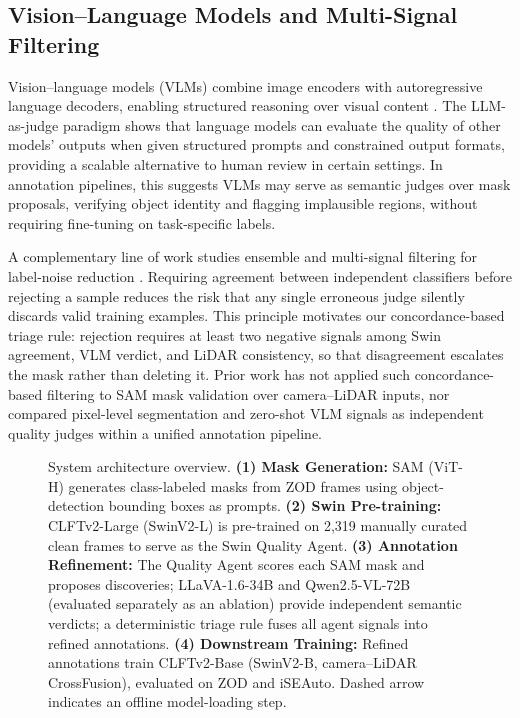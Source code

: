 \documentclass[conference]{IEEEtran}
\begin{document}
\subsection{Vision--Language Models and Multi-Signal Filtering}

Vision--language models (VLMs) combine image encoders with autoregressive language decoders, enabling structured reasoning over visual content \cite{liu2024llava,ye2023mplug,wang2024qwen2vl}. 
The LLM-as-judge paradigm \cite{zheng2023judging} shows that language models can evaluate the quality of other models' outputs when given structured prompts and constrained output formats, providing a scalable alternative to human review in certain settings. 
In annotation pipelines, this suggests VLMs may serve as semantic judges over mask proposals, verifying object identity and flagging implausible regions, without requiring fine-tuning on task-specific labels.

A complementary line of work studies ensemble and multi-signal filtering for label-noise reduction \cite{malach2017decoupling,han2018co}. 
Requiring agreement between independent classifiers before rejecting a sample reduces the risk that any single erroneous judge silently discards valid training examples. 
This principle motivates our concordance-based triage rule: rejection requires at least two negative signals among Swin agreement, VLM verdict, and LiDAR consistency, so that disagreement escalates the mask rather than deleting it. 
Prior work has not applied such concordance-based filtering to SAM mask validation over camera--LiDAR inputs, nor compared pixel-level segmentation and zero-shot VLM signals as independent quality judges within a unified annotation pipeline.



\begin{figure}[t]
    \centering
    \resizebox{\columnwidth}{!}{}
    \caption{System architecture overview.
             \textbf{(1) Mask Generation:} SAM (ViT-H) generates class-labeled masks from ZOD frames using object-detection bounding boxes as prompts.
             \textbf{(2) Swin Pre-training:} CLFTv2-Large (SwinV2-L) is pre-trained on 2{,}319 manually curated clean frames to serve as the Swin Quality Agent.
             \textbf{(3) Annotation Refinement:} The Quality Agent scores each SAM mask and proposes discoveries; LLaVA-1.6-34B and Qwen2.5-VL-72B (evaluated separately as an ablation) provide independent semantic verdicts; a deterministic triage rule fuses all agent signals into refined annotations.
             \textbf{(4) Downstream Training:} Refined annotations train CLFTv2-Base (SwinV2-B, camera--LiDAR CrossFusion), evaluated on ZOD and iSEAuto.
             Dashed arrow indicates an offline model-loading step.}
    \label{fig:architecture_overview}
\end{figure}
\end{document}
